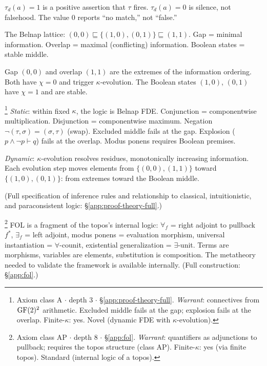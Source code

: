 \begin{definition}\label{def:evidence}
$\tau_d(a) = 1$ is a positive assertion that $\tau$ fires.
$\tau_d(a) = 0$ is silence, not falsehood. The value $0$
reports ``no match,'' not ``false.''
\end{definition}

\begin{definition}\label{def:info-order}
The Belnap lattice: $(0,0) \sqsubseteq \{(1,0), (0,1)\}
\sqsubseteq (1,1)$. Gap = minimal information. Overlap =
maximal (conflicting) information. Boolean states = stable
middle.
\end{definition}

\begin{proposition}\label{prop:extremal}
Gap $(0,0)$ and overlap $(1,1)$ are the extremes of the
information ordering. Both have $\chi = 0$ and trigger
$\kappa$-evolution. The Boolean states $(1,0)$, $(0,1)$
have $\chi = 1$ and are stable.
\end{proposition}

\begin{theorem}\label{thm:proof-theory}\footnote{Axiom class \textsf{A} $\cdot$ depth 3 $\cdot$ \S\ref{app:proof-theory-full}.  \emph{Warrant}: connectives from $\operatorname{GF}(2)^2$ arithmetic. Excluded middle fails at the gap; explosion fails at the overlap. Finite-$\kappa$: yes. Novel (dynamic FDE with $\kappa$-evolution).}
\emph{Static}: within fixed $\kappa$, the logic is Belnap
FDE. Conjunction = componentwise multiplication. Disjunction
= componentwise maximum. Negation $\neg(\tau, \sigma) =
(\sigma, \tau)$ (swap). Excluded middle fails at the gap.
Explosion ($p \wedge \neg p \vdash q$) fails at the
overlap. Modus ponens requires Boolean premises.

\emph{Dynamic}: $\kappa$-evolution resolves residues,
monotonically increasing information. Each evolution step
moves elements from $\{(0,0), (1,1)\}$ toward
$\{(1,0), (0,1)\}$: from extremes toward the Boolean
middle.

(Full specification of inference rules and relationship
to classical, intuitionistic, and paraconsistent logic:
\S\ref{app:proof-theory-full}.)
\end{theorem}

\begin{proposition}\footnote{Axiom class \textsf{AP} $\cdot$ depth 8 $\cdot$ \S\ref{app:fol}.  \emph{Warrant}: quantifiers as adjunctions to pullback; requires the topos structure (class \textsf{AP}). Finite-$\kappa$: yes (via finite topos). Standard (internal logic of a topos).}
\label{prop:fol}
FOL is a fragment of the topos's internal logic:
$\forall_f$ = right adjoint to pullback $f^*$,
$\exists_f$ = left adjoint, modus ponens = evaluation
morphism, universal instantiation = $\forall$-counit,
existential generalization = $\exists$-unit. Terms are
morphisms, variables are elements, substitution is
composition. The metatheory needed to validate the
framework is available internally.
(Full construction: \S\ref{app:fol}.)
\end{proposition}

